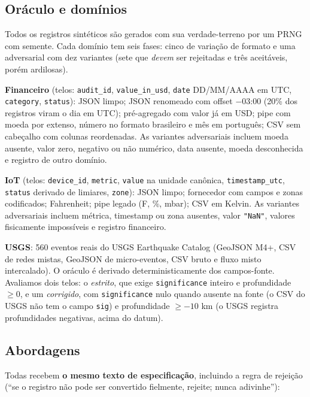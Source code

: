 \documentclass[sigconf,nonacm]{acmart}
\begin{document}
\subsection{Oráculo e domínios}

Todos os registros sintéticos são gerados com sua verdade-terreno por um PRNG com semente. Cada domínio tem seis fases: cinco de variação de formato e uma adversarial com dez variantes (sete que \textit{devem} ser rejeitadas e três aceitáveis, porém ardilosas).

\textbf{Financeiro} (telos: \texttt{audit\_\allowbreak id}, \texttt{value\_\allowbreak in\_\allowbreak usd}, \texttt{date} DD/MM/AAAA em UTC, \texttt{category}, \texttt{status}): JSON limpo; JSON renomeado com offset $-$03:00 (20\% dos registros viram o dia em UTC); pré-agregado com valor já em USD; pipe com moeda por extenso, número no formato brasileiro e mês em português; CSV sem cabeçalho com colunas reordenadas. As variantes adversariais incluem moeda ausente, valor zero, negativo ou não numérico, data ausente, moeda desconhecida e registro de outro domínio.

\textbf{IoT} (telos: \texttt{device\_id}, \texttt{metric}, \texttt{value} na unidade canônica, \texttt{timestamp\_utc}, \texttt{status} derivado de limiares, \texttt{zone}): JSON limpo; fornecedor com campos e zonas codificados; Fahrenheit; pipe legado (F, \%, mbar); CSV em Kelvin. As variantes adversariais incluem métrica, timestamp ou zona ausentes, valor \texttt{"NaN"}, valores fisicamente impossíveis e registro financeiro.

\textbf{USGS}: 560 eventos reais do USGS Earthquake Catalog (GeoJSON M4+, CSV de redes mistas, GeoJSON de micro-eventos, CSV bruto e fluxo misto intercalado). O oráculo é derivado deterministicamente dos campos-fonte. Avaliamos dois telos: o \textit{estrito}, que exige \texttt{significance} inteiro e profundidade $\geq 0$, e um \textit{corrigido}, com \texttt{significance} nulo quando ausente na fonte (o CSV do USGS não tem o campo \texttt{sig}) e profundidade $\geq -10$ km (o USGS registra profundidades negativas, acima do datum).

\subsection{Abordagens}

Todas recebem \textbf{o mesmo texto de especificação}, incluindo a regra de rejeição (``se o registro não pode ser convertido fielmente, rejeite; nunca adivinhe''):
\end{document}
